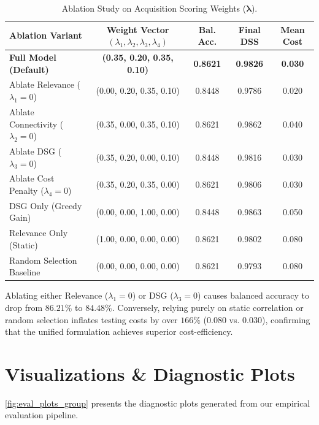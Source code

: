 \documentclass[11pt,a4paper]{report}
\begin{document}
\begin{table}[htbp]
  \centering
  \small
  \caption{Ablation Study on Acquisition Scoring Weights ($\boldsymbol{\lambda}$).}
  \label{tab:ablation_weights}
  \begin{tabularx}{\textwidth}{lcccc}
    \toprule
    \textbf{Ablation Variant} & \textbf{Weight Vector $(\lambda_1, \lambda_2, \lambda_3, \lambda_4)$} & \textbf{Bal. Acc.} & \textbf{Final DSS} & \textbf{Mean Cost} \\
    \midrule
    \textbf{Full Model (Default)} & \textbf{(0.35, 0.20, 0.35, 0.10)} & \textbf{0.8621} & \textbf{0.9826} & \textbf{0.030} \\
    Ablate Relevance ($\lambda_1 = 0$) & (0.00, 0.20, 0.35, 0.10) & 0.8448 & 0.9786 & 0.020 \\
    Ablate Connectivity ($\lambda_2 = 0$) & (0.35, 0.00, 0.35, 0.10) & 0.8621 & 0.9862 & 0.040 \\
    Ablate DSG ($\lambda_3 = 0$) & (0.35, 0.20, 0.00, 0.10) & 0.8448 & 0.9816 & 0.030 \\
    Ablate Cost Penalty ($\lambda_4 = 0$) & (0.35, 0.20, 0.35, 0.00) & 0.8621 & 0.9806 & 0.030 \\
    DSG Only (Greedy Gain) & (0.00, 0.00, 1.00, 0.00) & 0.8448 & 0.9863 & 0.050 \\
    Relevance Only (Static) & (1.00, 0.00, 0.00, 0.00) & 0.8621 & 0.9802 & 0.080 \\
    Random Selection Baseline & (0.00, 0.00, 0.00, 0.00) & 0.8621 & 0.9793 & 0.080 \\
    \bottomrule
  \end{tabularx}
\end{table}

Ablating either Relevance ($\lambda_1=0$) or DSG ($\lambda_3=0$) causes balanced accuracy to drop from $86.21\%$ to $84.48\%$. Conversely, relying purely on static correlation or random selection inflates testing costs by over $166\%$ ($0.080$ vs. $0.030$), confirming that the unified formulation achieves superior cost-efficiency.

\section{Visualizations \& Diagnostic Plots}
\cref{fig:eval_plots_group} presents the diagnostic plots generated from our empirical evaluation pipeline.
\end{document}
